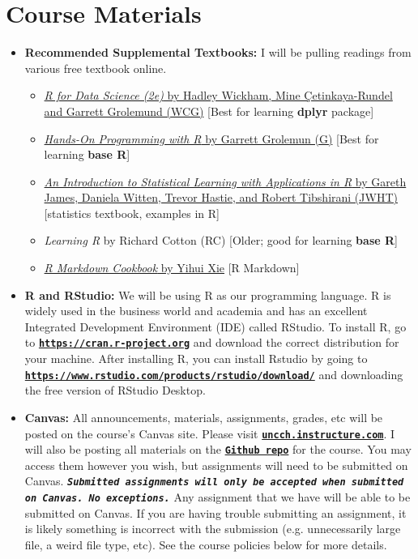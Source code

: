 \documentclass[11pt]{article}
\begin{document}
\section*{Course Materials}

\begin{itemize}

    \item \textbf{Recommended Supplemental Textbooks:} 
    I will be pulling readings from various free textbook online. 
    \begin{itemize}
        \item \href{https://r4ds.hadley.nz/}{\textit{R for Data Science (2e)} by Hadley Wickham, Mine \c{C}etinkaya-Rundel and Garrett Grolemund (WCG)} [Best for learning \textbf{dplyr} package]
        \item \href{https://rstudio-education.github.io/hopr/}{\textit{Hands-On Programming with R} by Garrett Grolemun (G)} [Best for learning \textbf{base R}]
        \item \href{https://web.stanford.edu/~hastie/ISLRv2_website.pdf}{\textit{An Introduction to Statistical Learning with Applications in R} by Gareth James, Daniela Witten, Trevor Hastie, and Robert Tibshirani (JWHT)} [statistics textbook, examples in R]
        \item \textit{Learning R} by Richard Cotton (RC) [Older; good for learning \textbf{base R}]
        \item \href{https://bookdown.org/yihui/rmarkdown-cookbook/}{\textit{R Markdown Cookbook} by Yihui Xie} [R Markdown]
    \end{itemize}
    
    \item \textbf{R and RStudio:} We will be using R as our programming language. R is widely used in the business world and academia and has an excellent Integrated Development Environment (IDE) called RStudio. To install R, go to \href{https://cran.r-project.org}{\tt\bf https://cran.r-project.org} and download the correct distribution for your machine. After installing R, you can install Rstudio by going to \href{https://www.rstudio.com/products/rstudio/download/}{\tt\bf https://www.rstudio.com/products/rstudio/download/} and downloading the free version of RStudio Desktop.
    
    \item \textbf{Canvas:} All announcements, materials, assignments, grades, etc will be posted on the course's Canvas site. Please visit \href{https://uncch.instructure.com/}{\tt\bf uncch.instructure.com}. I will also be posting all materials on the \href{https://github.com/JiaxiLi1995/ECON370}{\tt\bf Github repo} for the course. You may access them however you wish, but assignments will need to be submitted on Canvas. {\tt\bf  \emph{Submitted assignments will only be accepted when submitted on Canvas. No exceptions.}} Any assignment that we have will be able to be submitted on Canvas. If you are having trouble submitting an assignment, it is likely something is incorrect with the submission (e.g. unnecessarily large file, a weird file type, etc). See the course policies below for more details.
\end{itemize}
\end{document}
